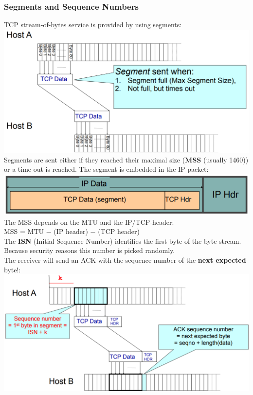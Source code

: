 \documentclass[a4paper, fontsize=8pt, landscape, DIV=1]{scrartcl}
\begin{document}
\begin{multicols*}{4}
		\subsubsection{Segments and Sequence Numbers}
		TCP stream-of-bytes service is provided by using segments:\\ 
		\includegraphics[width=\columnwidth]{images/Transport_Layer/segment_send.png}
		Segments are sent either if they reached their maximal size (\textbf{MSS}
		(usually 1460)) or a time out is reached. The segment is embedded in the IP
		packet:
		\includegraphics[width=\columnwidth]{images/Transport_Layer/TCP_in_IP.png}
		The MSS depends on the MTU and the IP/TCP-header:\\
		MSS = MTU $-$ (IP header) $-$ (TCP header)\\
		The \textbf{ISN} (Initial Sequence Number) identifies the first byte of the
		byte-stream. Because security reasons this number is picked randomly. \\
		The receiver will send an ACK with the sequence number of the \textbf{next
			expected} byte!:
		\includegraphics[width=\columnwidth]{images/Transport_Layer/ACK_seqnumb.png}
		

\end{multicols*}
\end{document}
